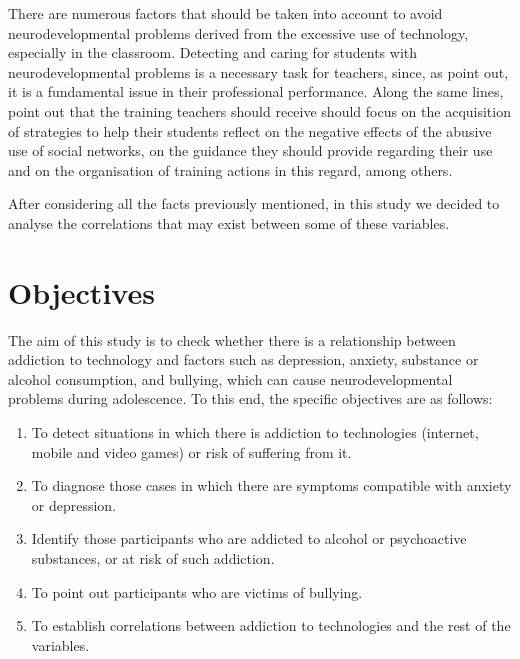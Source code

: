 \documentclass[english]{textolivre}
\begin{document}
There are numerous factors that should be taken into account to avoid neurodevelopmental problems derived from the excessive use of technology, especially in the classroom. Detecting and caring for students with neurodevelopmental problems is a necessary task for teachers, since, as \textcite{huertareyes2021trastornos} %
point out, it is a fundamental issue in their professional performance. Along the same lines, \textcite{valencia2021problematica} %
point out that the training teachers should receive should focus on the acquisition of strategies to help their students reflect on the negative effects of the abusive use of social networks, on the guidance they should provide regarding their use and on the organisation of training actions in this regard, among others.

After considering all the facts previously mentioned, in this study we decided to analyse the correlations that may exist between some of these variables.


\section{Objectives}\label{sec-obj}
The aim of this study is to check whether there is a relationship between addiction to technology and factors such as depression, anxiety, substance or alcohol consumption, and bullying, which can cause neurodevelopmental problems during adolescence. To this end, the specific objectives are as follows:
\begin{enumerate}
    \item To detect situations in which there is addiction to technologies (internet, mobile and video games) or risk of suffering from it.
    \item To diagnose those cases in which there are symptoms compatible with anxiety or depression.
    \item Identify those participants who are addicted to alcohol or psychoactive substances, or at risk of such addiction.
    \item To point out participants who are victims of bullying.
    \item To establish correlations between addiction to technologies and the rest of the variables.
\end{enumerate}
\end{document}
